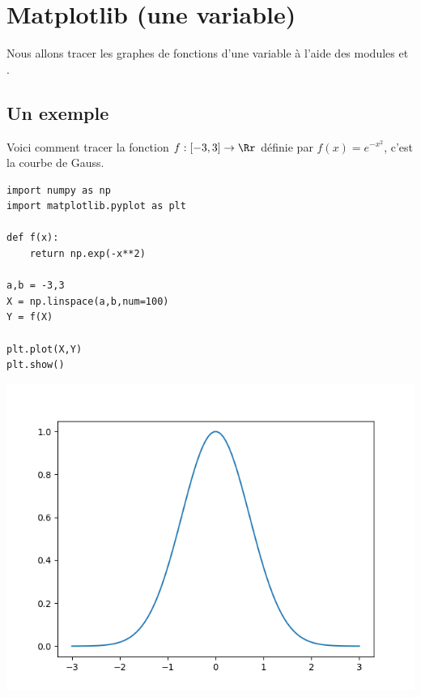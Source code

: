 \documentclass[11pt,class=report,crop=false]{standalone}
\begin{document}
\section{Matplotlib (une variable)}

Nous allons tracer les graphes de fonctions d'une variable à l'aide des modules \matplotlib{} et \numpy{}.

\subsection{Un exemple}

Voici comment tracer la fonction $f : [-3,3] \to \Rr$ définie par $f(x) =e^{-x^2}$, c'est la courbe de Gauss.

\begin{minipage}{0.4\textwidth}
\begin{lstlisting}
import numpy as np
import matplotlib.pyplot as plt

def f(x):
	return np.exp(-x**2)

a,b = -3,3
X = np.linspace(a,b,num=100)
Y = f(X)

plt.plot(X,Y)
plt.show()
\end{lstlisting}
\end{minipage}
\begin{minipage}{0.49\textwidth}
\begin{center}
\includegraphics[scale=\myscale,scale=0.55]{figures/pythonx-gauss}
\end{center}
\end{minipage}
\end{document}
